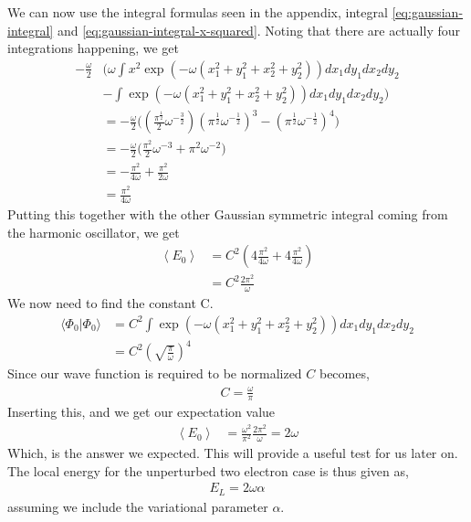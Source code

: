 \documentclass[11pt]{article}
\newcommand{\expect}[1]{\left\langle{#1}\right\rangle}
\begin{document}
We can now use the integral formulas seen in the appendix, integral \eqref{eq:gaussian-integral} and \eqref{eq:gaussian-integral-x-squared}. Noting that there are actually four integrations happening, we get
\begin{align*}
	-\frac{\omega}{2}&\bigg( \omega \int x^2 \exp \left(-\omega\left(x_1^2 + y_1^2 + x_2^2 + y_2^2\right)\right) dx_1 dy_1 dx_2 dy_2 \\
	&- \int \exp \left(-\omega\left(x_1^2 + y_1^2 + x_2^2 + y_2^2\right)\right) dx_1 dy_1 dx_2 dy_2 \bigg) \\
	&= -\frac{\omega}{2}\bigg( \left(\frac{\pi^\frac{1}{2}}{2}\omega^{-\frac{3}{2}}\right)\left(\pi^\frac{1}{2} \omega^{-\frac{1}{2}}\right)^3 - \left(\pi^\frac{1}{2} \omega^{-\frac{1}{2}}\right)^4\bigg) \\
	&= -\frac{\omega}{2}\bigg( \frac{\pi^2}{2}\omega^{-3} + \pi^2\omega^{-2} \bigg) \\
	&= -\frac{\pi^2}{4\omega} + \frac{\pi^2}{2\omega} \\
	&= \frac{\pi^2}{4\omega}
\end{align*}
Putting this together with the other Gaussian symmetric integral coming from the harmonic oscillator, we get
\begin{align*}
	\expect{E_0} &= C^2\left( 4\frac{\pi^2}{4\omega} + 4\frac{\pi^2}{4\omega} \right) \\
	&= C^2 \frac{2\pi^2}{\omega}
\end{align*}
We now need to find the constant C.
\begin{align*}
	\langle \Phi_0 | \Phi_0\rangle &= C^2\int\exp \left( -\omega\left(x_1^2 + y_1^2 + x_2^2 + y_2^2\right) \right) dx_1dy_1dx_2dy_2 \\
	&= C^2\left( \sqrt{\frac{\pi}{\omega}} \right)^4
\end{align*}
Since our wave function is required to be normalized $C$ becomes,
\begin{align*}
	C = \frac{\omega}{\pi}
\end{align*}
Inserting this, and we get our expectation value
\begin{align*}
	\expect{E_0} &= \frac{\omega^2}{\pi^2}\frac{2\pi^2}{\omega} = 2\omega
\end{align*}
Which, is the answer we expected. This will provide a useful test for us later on. The local energy for the unperturbed two electron case is thus given as,
\begin{align}
	E_L = 2\omega\alpha
	\label{eq:two-electron-local-energy-unperturbed}
\end{align}
assuming we include the variational parameter $\alpha$.
\end{document}
